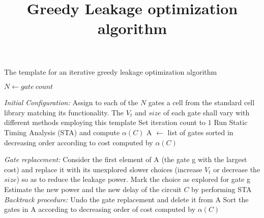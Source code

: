 \begin{algorithm}
\scriptsize
\LinesNumbered
\title{Greedy Leakage optimization algorithm}
\caption{The template for an iterative greedy leakage optimization algorithm }
\label{alg:naive}
 $N \leftarrow gate\ count$\; 

    \textit{Initial Configuration:} Assign to each of the $N$ gates a cell from the standard cell library matching its functionality. The $V_t$ and $size$ of each gate shall vary with different methods employing this template\;
Set iteration count to $1$\;
    Run Static Timing Analysis (STA) and compute $\alpha(C)$\; 
    A $\leftarrow$ list of gates sorted in decreasing order according to cost computed by $\alpha(C)$\;
   
     {
        \textit{Gate replacement:} Consider the first element of A (the gate g with the largest cost) and replace it with its unexplored slower choices (increase $V_t$ or decrease the $size$) so as to reduce the leakage power. Mark the choice as explored for gate g\;
        Estimate the new power and the new delay of the circuit $C$ by performing STA\;
         { 
        \textit{Backtrack procedure:} 
            Undo the gate replacement and delete it from A\;
        }
        Sort the gates in A according to decreasing order of cost computed by $\alpha(C)$\;
    }
\end{algorithm}

